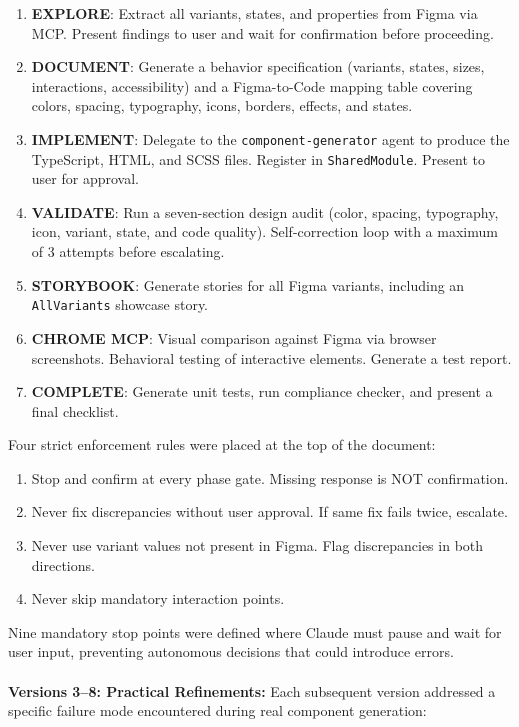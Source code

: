 \begin{enumerate}
    \item[\textbf{Phase 0:}] \textbf{EXPLORE}: Extract all variants, states, and properties from Figma via MCP. Present findings to user and wait for confirmation before proceeding.
    \item[\textbf{Phase 1:}] \textbf{DOCUMENT}: Generate a behavior specification (variants, states, sizes, interactions, accessibility) and a Figma-to-Code mapping table covering colors, spacing, typography, icons, borders, effects, and states.
    \item[\textbf{Phase 2:}] \textbf{IMPLEMENT}: Delegate to the \texttt{component-generator} agent to produce the TypeScript, HTML, and SCSS files. Register in \texttt{SharedModule}. Present to user for approval.
    \item[\textbf{Phase 3:}] \textbf{VALIDATE}: Run a seven-section design audit (color, spacing, typography, icon, variant, state, and code quality). Self-correction loop with a maximum of 3 attempts before escalating.
    \item[\textbf{Phase 4:}] \textbf{STORYBOOK}: Generate stories for all Figma variants, including an \texttt{AllVariants} showcase story.
    \item[\textbf{Phase 5:}] \textbf{CHROME MCP}: Visual comparison against Figma via browser screenshots. Behavioral testing of interactive elements. Generate a test report.
    \item[\textbf{Phase 6:}] \textbf{COMPLETE}: Generate unit tests, run compliance checker, and present a final checklist.
\end{enumerate}

Four strict enforcement rules were placed at the top of the document:
\begin{enumerate}
    \item Stop and confirm at every phase gate. Missing response is NOT confirmation.
    \item Never fix discrepancies without user approval. If same fix fails twice, escalate.
    \item Never use variant values not present in Figma. Flag discrepancies in both directions.
    \item Never skip mandatory interaction points.
\end{enumerate}

Nine mandatory stop points were defined where Claude must pause and wait for user input, preventing autonomous decisions that could introduce errors.
\\\\
\textbf{Versions 3--8: Practical Refinements:} Each subsequent version addressed a specific failure mode encountered during real component generation:

